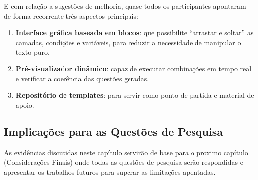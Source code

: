 E com relação a sugestões de melhoria, quase todos os participantes apontaram de forma recorrente três aspectos principais:

\begin{enumerate}
\item \textbf{Interface gráfica baseada em blocos}:  que possibilite “arrastar e soltar” as camadas, condições e variáveis, para reduzir a necessidade de manipular o texto puro.
\item \textbf{Pré-visualizador dinâmico}: capaz de executar combinações em tempo real e verificar a coerência das questões geradas.
\item \textbf{Repositório de templates}: para servir como ponto de partida e material de apoio.
\end{enumerate}


\subsection{Implicações para as Questões de Pesquisa}

As evidências discutidas neste capítulo servirão de base para o proximo capítulo (Considerações Finais) onde todas as questões de pesquisa serão respondidas e apresentar os trabalhos futuros para superar as limitações apontadas. 
	
